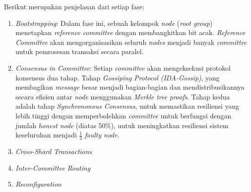 Berikut merupakan penjelasan dari setiap fase:

\begin{enumerate}
  \item \textit{Bootstrapping}: Dalam fase ini, sebuah kelompok \textit{node} (\textit{root group}) menetapkan \textit{reference committee} dengan membangkitkan bit acak. \textit{Reference Committee} akan mengorganisasikan seluruh \textit{nodes} menjadi banyak \textit{committee} untuk pemrosesan transaksi secara paralel.
  \item \textit{Consensus in Committee}: Setiap \textit{committee} akan mengeksekusi protokol konsensus dua tahap. Tahap \textit{Gossiping Protocol (IDA-Gossip)}, yang membagikan \textit{message} besar menjadi bagian-bagian dan mendistribusikannya secara efisien antar \textit{node} menggunakan \textit{Merkle tree proofs}. Tahap kedua adalah tahap \textit{Synchrononous Consensus}, untuk memastikan resiliensi yang lebih tinggi dengan memperbolehkan \textit{committee} untuk berfungsi dengan jumlah \textit{honest node} (diatas 50\%), untuk meningkatkan resiliensi sistem keseluruhan menjadi $\frac{1}{3}$ \textit{faulty node}. 
  \item \textit{Cross-Shard Transactions}
  \item \textit{Inter-Committee Routing}
  \item \textit{Reconfiguration}
\end{enumerate}